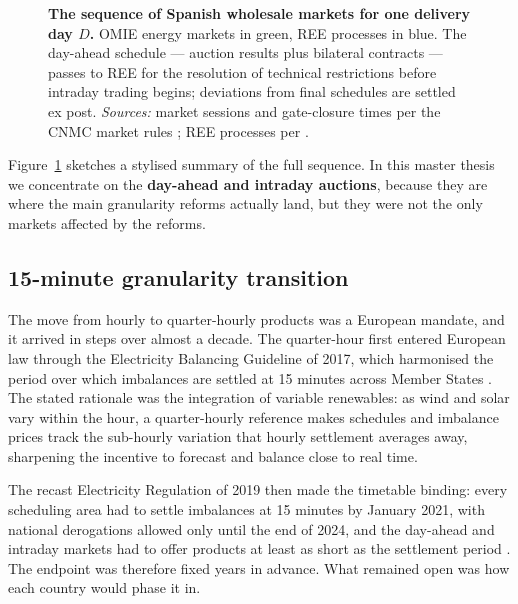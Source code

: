 \documentclass[11pt,a4paper]{article}
\theoremstyle{definition}
\theoremstyle{remark}
\theoremstyle{plain}
\begin{document}
\begin{figure}[H]
\caption{\textbf{The sequence of Spanish wholesale markets for one delivery day $D$.} OMIE energy markets in green, REE processes in blue. The day-ahead schedule --- auction results plus bilateral contracts --- passes to REE for the resolution of technical restrictions before intraday trading begins; deviations from final schedules are settled ex post. \emph{Sources:} market sessions and gate-closure times per the CNMC market rules \citep{cnmc_sidc_ida_2024, boe_a_2025_4908}; REE processes per \citet{ree_guia_ajuste_2024}.}
\label{fig:market-structure}
\end{figure}

Figure~\ref{fig:market-structure} sketches a stylised summary of the full sequence. In this master thesis we concentrate on the \textbf{day-ahead and intraday auctions}, because they are where the main granularity reforms actually land, but they were not the only markets affected by the reforms.


\subsection{15-minute granularity transition}

The move from hourly to quarter-hourly products was a European mandate, and it arrived in steps over almost a decade. The quarter-hour first entered European law through the Electricity Balancing Guideline of 2017, which harmonised the period over which imbalances are settled at 15 minutes across Member States \citep{eu_2017_2195}. The stated rationale was the integration of variable renewables: as wind and solar vary within the hour, a quarter-hourly reference makes schedules and imbalance prices track the sub-hourly variation that hourly settlement averages away, sharpening the incentive to forecast and balance close to real time.

The recast Electricity Regulation of 2019 then made the timetable binding: every scheduling area had to settle imbalances at 15 minutes by January 2021, with national derogations allowed only until the end of 2024, and the day-ahead and intraday markets had to offer products at least as short as the settlement period \citep{eu_2019_943}. The endpoint was therefore fixed years in advance. What remained open was how each country would phase it in.
\end{document}
